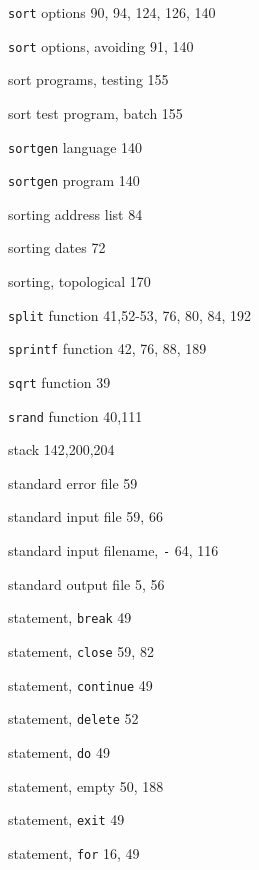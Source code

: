 \begin{multicols}{3}
\hangindent=3pc  \verb'sort' options 90, 94, 124, 126, 140

\hangindent=3pc  \verb'sort' options, avoiding 91, 140


\hangindent=3pc  sort programs, testing 155

\hangindent=3pc  sort test program, batch 155

\hangindent=3pc  \verb'sortgen' language 140

\hangindent=3pc  \verb'sortgen' program 140

\hangindent=3pc  sorting address list 84

\hangindent=3pc  sorting dates 72

\hangindent=3pc  sorting, topological 170

\hangindent=3pc  \verb'split' function 41,52-53, 76, 80, 84, 192

\hangindent=3pc  \verb'sprintf' function 42, 76, 88, 189

\hangindent=3pc  \verb'sqrt' function 39

\hangindent=3pc  \verb'srand' function 40,111

\hangindent=3pc  stack 142,200,204

\hangindent=3pc  standard error file 59

\hangindent=3pc  standard input file 59, 66

\hangindent=3pc  standard input filename, \verb'-' 64, 116

\hangindent=3pc  standard output file 5, 56

\hangindent=3pc  statement, \verb'break' 49

\hangindent=3pc  statement, \verb'close' 59, 82

\hangindent=3pc  statement, \verb'continue' 49

\hangindent=3pc  statement, \verb'delete' 52

\hangindent=3pc  statement, \verb'do' 49

\hangindent=3pc  statement, empty 50, 188

\hangindent=3pc  statement, \verb'exit' 49

\hangindent=3pc  statement, \verb'for' 16, 49


\end{multicols}
